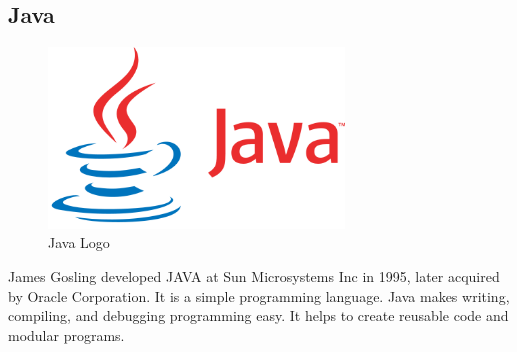 

\subsection{Java}

\begin{figure}[H]
	\centering
	\includegraphics[width=0.7\textwidth]{img/technology/java.png}
	\caption{Java Logo}
	\label{fig:JavaLogo}
\end{figure}

James Gosling developed JAVA at Sun Microsystems Inc in 1995, later acquired by Oracle Corporation. It is a simple programming language. Java makes writing, compiling, and debugging programming easy. It helps to create reusable code and modular programs.

